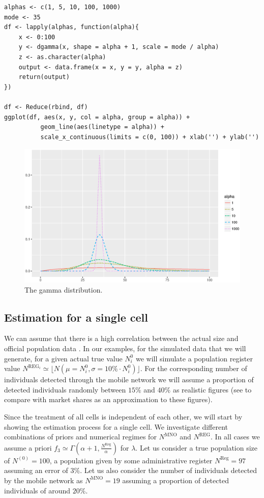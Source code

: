 \documentclass[12pt, a4paper]{article}
\begin{document}
\begin{verbatim}
alphas <- c(1, 5, 10, 100, 1000)
mode <- 35
df <- lapply(alphas, function(alpha){
    x <- 0:100
    y <- dgamma(x, shape = alpha + 1, scale = mode / alpha)
    z <- as.character(alpha)
    output <- data.frame(x = x, y = y, alpha = z)
    return(output)
})

df <- Reduce(rbind, df)
ggplot(df, aes(x, y, col = alpha, group = alpha)) + 
          geom_line(aes(linetype = alpha)) + 
          scale_x_continuous(limits = c(0, 100)) + xlab('') + ylab('')
\end{verbatim}


\begin{figure}
	\centering
	\includegraphics[scale=0.75]{gamma.eps}
	\caption{The gamma distribution.}
	\label{gamma}
\end{figure}


\subsection{Estimation for a single cell}
We can assume that there is a high correlation between the actual size and official population data \cite{Q2016}.
In our examples, for the simulated data that we will generate, for a given actual true 
value $N^{0}_{i}$ we will simulate a population register value $N^{\textrm{REG}_{i}}\simeq \lfloor N(\mu = N^{0}_{i}, \sigma = 10\%\cdot N^{0}_{i})\rfloor$. For the corresponding number of individuals detected through the mobile network we will assume a proportion 
of detected individuals randomly between $15\%$ and $40\%$ as realistic figures (see  \cite{WP5Del11} to compare with market shares as an approximation to these figures).

Since the treatment of all cells is independent of each other, we will start by showing the 
estimation process for a single cell. We investigate different combinations of priors and 
numerical regimes for $N^{\textrm{MNO}}$ and $N^{\textrm{REG}}$. In all cases we assume a 
priori $f_{3}\simeq\Gamma\left(\alpha + 1, \frac{N^{\textrm{Reg}}}{\alpha}\right)$ for $\lambda$.
Let us consider a true population size of $N^{(0)} = 100$, a population given by some administrative register
$N^{\textrm{Reg}}=97$ assuming an error of $3\%$. 
Let us also consider the number of individuals detected by the mobile network as $N^{\textrm{MNO}} = 19$ 
assuming a proportion of detected individuals of around $20\%$.
\end{document}
